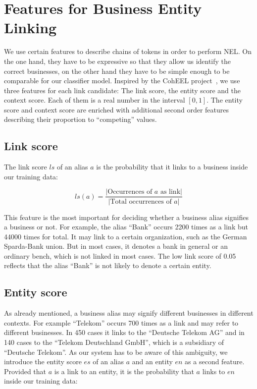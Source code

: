 \section{Features for Business Entity Linking}
\label{sec:features}
We use certain features to describe chains of tokens in order to perform NEL. On the one hand, they have to be expressive so that they allow us identify the correct businesses, on the other hand they have to be simple enough to be comparable for our classifier model. Inspired by the CohEEL project~\cite{coheel}, we use three features for each link candidate: The link score, the entity score and the context score. Each of them is a real number in the interval $[0, 1]$. The entity score and context score are enriched with additional second order features describing their proportion to "`competing"' values.\\



\subsection{Link score}
\label{sec:link_score}
The link score $ls$ of an alias $a$ is the probability that it links to a business inside our training data:

\begin{equation*} %
ls(a) = \frac{|\text{Occurrences of $a$ as link}|}{|\text{Total occurrences of $a$}|}
\end{equation*}

This feature is the most important for deciding whether a business alias signifies a business or not. For example, the alias "`Bank"' occurs 2200 times as a link but 44000 times for total. It may link to a certain organization, such as the German Sparda-Bank union. But in most cases, it denotes a bank in general or an ordinary bench, which is not linked in most cases. The low link score of 0.05 reflects that the alias "`Bank"' is not likely to denote a certain entity.\\



\subsection{Entity score}
\label{sec:entity_score}
As already mentioned, a business alias may signify different businesses in different contexts. For example "`Telekom"' occurs 700 times as a link and may refer to different businesses. In 450 cases it links to the "`Deutsche Telekom AG"' and in 140 cases to the "`Telekom Deutschland GmbH"', which is a subsidiary of "`Deutsche Telekom"'.\footnotemark{} As our system has to be aware of this ambiguity, we introduce the entity score $es$ of an alias $a$ and an entity $en$ as a second feature. Provided that $a$ is a link to an entity, it is the probability that $a$ links to $en$ inside our training data:

